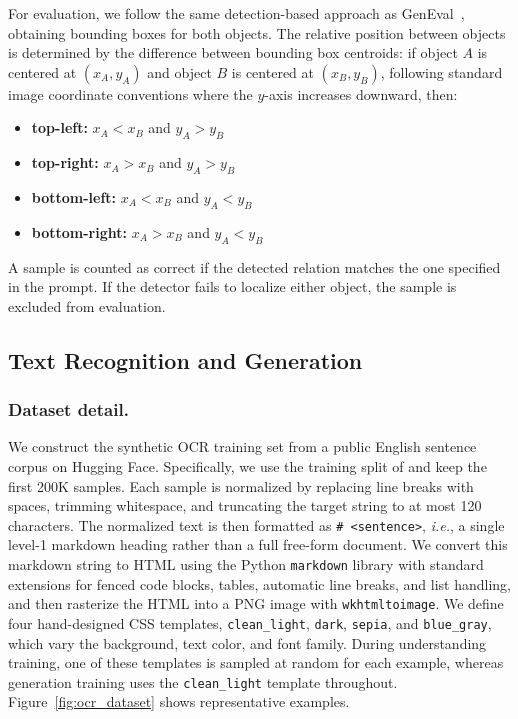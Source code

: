For evaluation, we follow the same detection-based approach as GenEval~\cite{ghosh2023geneval}, obtaining bounding boxes for both objects. 
The relative position between objects is determined by the difference 
between bounding box centroids: if object $A$ is centered at $(x_A, y_A)$ 
and object $B$ is centered at $(x_B, y_B)$, following standard image 
coordinate conventions where the $y$-axis increases downward, then:
\begin{itemize}[label=\textbullet]
    \item \textbf{top-left:} $x_A < x_B$ and $y_A > y_B$
    \item \textbf{top-right:} $x_A > x_B$ and $y_A > y_B$
    \item \textbf{bottom-left:} $x_A < x_B$ and $y_A < y_B$
    \item \textbf{bottom-right:} $x_A > x_B$ and $y_A < y_B$
\end{itemize}
A sample is counted as correct if the detected relation matches the one 
specified in the prompt. If the detector fails to localize either object, 
the sample is excluded from evaluation.


\subsection{Text Recognition and Generation}
\subsubsection{Dataset detail.} We construct the synthetic OCR training set from a public English sentence corpus on Hugging Face. Specifically, we use the training split of  and keep the first 200K samples. Each sample is normalized by replacing line breaks with spaces, trimming whitespace, and truncating the target string to at most 120 characters. The normalized text is then formatted as \texttt{\# <sentence>}, \textit{i.e.}, a single level-1 markdown heading rather than a full free-form document. We convert this markdown string to HTML using the Python \texttt{markdown} library with standard extensions for fenced code blocks, tables, automatic line breaks, and list handling, and then rasterize the HTML into a PNG image with \texttt{wkhtmltoimage}. We define four hand-designed CSS templates, \texttt{clean\_light}, \texttt{dark}, \texttt{sepia}, and \texttt{blue\_gray}, which vary the background, text color, and font family. During understanding training, one of these templates is sampled at random for each example, whereas generation training uses the \texttt{clean\_light} template throughout. Figure~\ref{fig:ocr_dataset} shows representative examples.

